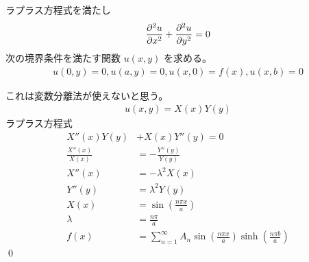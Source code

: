 \documentclass[uplatex,dvipdfmx,a4paper,11pt]{jlreq}
\makeatletter
\theoremstyle{definition}
\renewenvironment{proof}[1][\proofname]{\par
  \normalfont
  \topsep6\p@\@plus6\p@ \trivlist
  \item[\hskip\labelsep{\bfseries #1}\@addpunct{\bfseries}]\ignorespaces\quad\par
}{%
  \qed\endtrivlist\@endpefalse
}
\renewcommand\proofname{証明}
\makeatother
\begin{document}
\begin{proposition}
  ラプラス方程式を満たし
  \begin{align}
    \pdv[2]{u}{x} + \pdv[2]{u}{y} = 0
  \end{align}
  次の境界条件を満たす関数 $u(x, y)$ を求める。
  \begin{align}
    u(0, y) = 0, u(a, y) = 0, u(x, 0) = f(x), u(x, b) = 0
  \end{align}
\end{proposition}
\begin{proof}
  これは変数分離法が使えないと思う。
  \begin{align}
    u(x, y) = X(x)Y(y)
  \end{align}
  ラプラス方程式
  \begin{align}
    X''(x)Y(y)          & + X(x)Y''(y) = 0                                                      \\
    \frac{X''(x)}{X(x)} & = - \frac{Y''(y)}{Y(y)}                                               \\
    X''(x)              & = - \lambda^2X(x)                                                     \\
    Y''(y)              & = \lambda^2Y(y)                                                       \\
    X(x)                & = \sin(\frac{n\pi x}{a})                                              \\
    \lambda             & = \frac{n\pi}{a}                                                      \\
    f(x)                & = \sum_{n=1}^{\infty}A_n\sin(\frac{n\pi x}{a})\sinh(\frac{n\pi b}{a})
  \end{align}
\end{proof}
\end{document}
